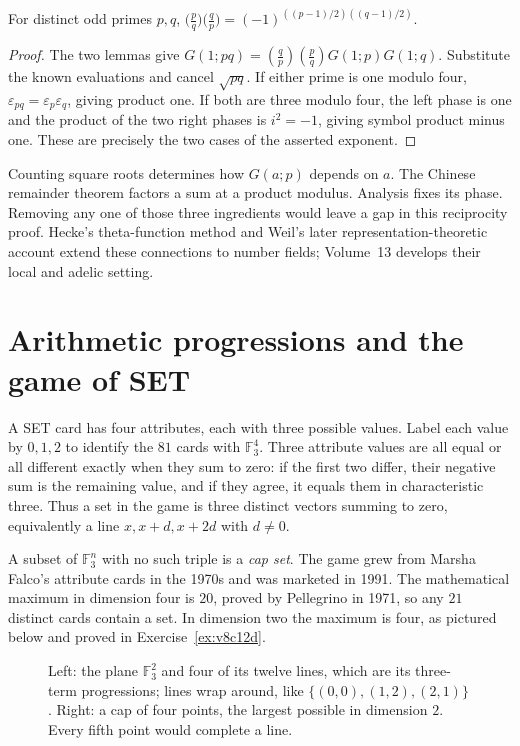 \begin{theorem}\label{thm:qr}
For distinct odd primes $p,q$,
$\bigl(\frac pq\bigr)\bigl(\frac qp\bigr)=(-1)^{((p-1)/2)((q-1)/2)}$.
\end{theorem}
\begin{proof}
The two lemmas give
$G(1;pq)=(\frac qp)(\frac pq)G(1;p)G(1;q)$.
Substitute the known evaluations and cancel $\sqrt{pq}$. If either prime is one modulo four, $\varepsilon_{pq}=\varepsilon_p\varepsilon_q$, giving product one. If both are three modulo four, the left phase is one and the product of the two right phases is $i^2=-1$, giving symbol product minus one. These are precisely the two cases of the asserted exponent.
\end{proof}

\begin{beauty}
Counting square roots determines how $G(a;p)$ depends on $a$. The Chinese remainder theorem factors a sum at a product modulus. Analysis fixes its phase. Removing any one of those three ingredients would leave a gap in this reciprocity proof. Hecke's theta-function method and Weil's later representation-theoretic account extend these connections to number fields; Volume~13 develops their local and adelic setting.
\end{beauty}

\section{Arithmetic progressions and the game of SET}

A SET card has four attributes, each with three possible values. Label each value by $0,1,2$ to identify the $81$ cards with $\mathbb F_3^4$. Three attribute values are all equal or all different exactly when they sum to zero: if the first two differ, their negative sum is the remaining value, and if they agree, it equals them in characteristic three. Thus a set in the game is three distinct vectors summing to zero, equivalently a line $x,x+d,x+2d$ with $d\ne0$.

A subset of $\mathbb F_3^n$ with no such triple is a \emph{cap set}. The game grew from Marsha Falco's attribute cards in the 1970s and was marketed in 1991. The mathematical maximum in dimension four is $20$, proved by Pellegrino in 1971, so any $21$ distinct cards contain a set. In dimension two the maximum is four, as pictured below and proved in Exercise~\ref{ex:v8c12d}.

\begin{figure}[ht]
\centering
{}
\caption{Left: the plane $\mathbb F_3^2$ and four of its twelve lines, which are its three-term progressions; lines wrap around, like
$\{(0,0),(1,2),(2,1)\}$. Right: a cap of four points, the largest possible in dimension $2$. Every fifth point would complete a line.}
\label{fig:cap}
\end{figure}


